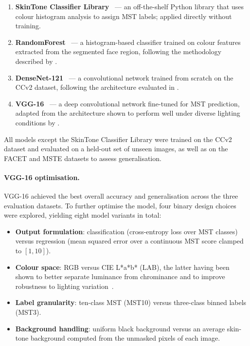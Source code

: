 \begin{enumerate}
	\item \textbf{SkinTone Classifier Library}~\cite{skintone2023lib} — an off-the-shelf Python library that uses colour histogram analysis to assign MST labels; applied directly without training.
	\item \textbf{RandomForest}~\cite{wu2023skintone} — a histogram-based classifier trained on colour features extracted from the segmented face region, following the methodology described by \cite{wu2023skintone}.
	\item \textbf{DenseNet-121}~\cite{wu2023skintone} — a convolutional network trained from scratch on the CCv2 dataset, following the architecture evaluated in \cite{wu2023skintone}.
	\item \textbf{VGG-16}~\cite{simonyan2015vgg} — a deep convolutional network fine-tuned for MST prediction, adapted from the architecture shown to perform well under diverse lighting conditions by \cite{krishnapriya2024lighting}.
\end{enumerate}

All models except the SkinTone Classifier Library were trained on the CCv2 dataset and evaluated on a held-out set of unseen images, as well as on the FACET and MSTE datasets to assess generalisation.

\paragraph{VGG-16 optimisation.}
VGG-16 achieved the best overall accuracy and generalisation across the three evaluation datasets. To further optimise the model, four binary design choices were explored, yielding eight model variants in total:

\begin{itemize}
	\item \textbf{Output formulation}: classification (cross-entropy loss over MST classes) versus regression (mean squared error over a continuous MST score clamped to $[1, 10]$).
	\item \textbf{Colour space}: RGB versus CIE L*a*b* (LAB), the latter having been shown to better separate luminance from chrominance and to improve robustness to lighting variation~\cite{krishnapriya2024lighting}.
	\item \textbf{Label granularity}: ten-class MST (MST10) versus three-class binned labels (MST3).
	\item \textbf{Background handling}: uniform black background versus an average skin-tone background computed from the unmasked pixels of each image.
\end{itemize}

